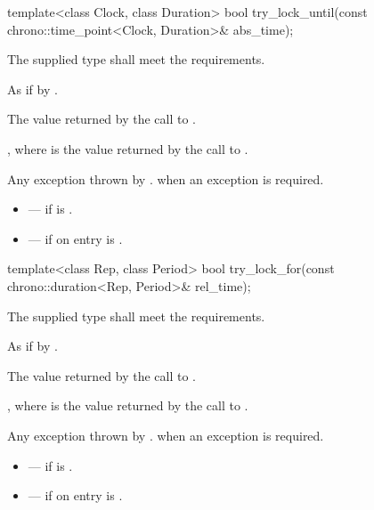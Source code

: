 %
\begin{itemdecl}
template<class Clock, class Duration>
  bool try_lock_until(const chrono::time_point<Clock, Duration>& abs_time);
\end{itemdecl}

\begin{itemdescr}
\pnum
\requires The supplied  type shall meet the 
requirements.

\pnum
\effects
As if by .

\pnum
\returns
The value returned by the call to .

\pnum
\ensures
{}, where  is the value returned by
the call to .

\pnum
\throws
Any exception thrown by .  when an
exception is required.

\pnum
\errors
\begin{itemize}
\item {} --- if  is .
\item {} --- if on entry  is
.
\end{itemize}
\end{itemdescr}

%
\begin{itemdecl}
template<class Rep, class Period>
  bool try_lock_for(const chrono::duration<Rep, Period>& rel_time);
\end{itemdecl}

\begin{itemdescr}
\pnum
\requires The supplied  type shall meet the  requirements.

\pnum
\effects
As if by .

\pnum
\returns
The value returned by the call to .

\pnum
\ensures
{}, where  is the value returned by the call to .

\pnum
\throws
Any exception thrown by .  when an
exception is required.

\pnum
\errors
\begin{itemize}
\item {} --- if  is .
\item {} --- if on entry  is
.
\end{itemize}
\end{itemdescr}

